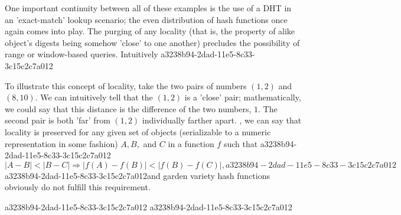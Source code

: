 \documentclass[12pt]{article}
\begin{document}
\par One important continuity between all of these examples is the use of a DHT in an 'exact-match' lookup scenario; the even distribution of hash functions once again comes into play. The purging of any locality (that is, the property of alike object's digests being somehow 'close' to one another) precludes the possibility of range or window-based queries. Intuitively
a3238b94-2dad-11e5-8c33-3c15c2c7a012
\par To illustrate this concept of locality, take the two pairs of numbers $(1,2)$ and $(8,10)$. We can intuitively tell that the $(1,2)$ is a 'close' pair; mathematically, we could say that this distance is the difference of the two numbers, $1$. The second pair is both 'far' from $(1,2)$ individually farther apart. , we can say that locality is preserved for any given set of objects (serializable to a numeric representation in some fashion) $A,B,$ and $C$ in a function $f$ such that
a3238b94-2dad-11e5-8c33-3c15c2c7a012\begin{equation}
|A-B| < |B-C| \Rightarrow |f(A)-f(B)| < |f(B) - f(C)|,
a3238b94-2dad-11e5-8c33-3c15c2c7a012\end{equation}
a3238b94-2dad-11e5-8c33-3c15c2c7a012and garden variety hash functions obviously do not fulfill this requirement.

a3238b94-2dad-11e5-8c33-3c15c2c7a012\printbibliography
a3238b94-2dad-11e5-8c33-3c15c2c7a012
\end{document}
